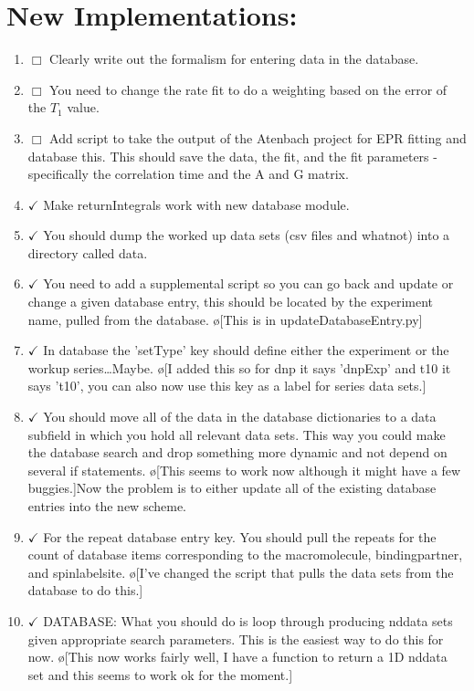\documentclass[10pt]{book}
\begin{document}
\section{New Implementations:}
\begin{enumerate}
    \item $\Box$ Clearly write out the formalism for entering data in the database.
    \item $\Box$ You need to change the rate fit to do a weighting based on the error of the $T_1$ value.
    \item $\Box$ Add script to take the output of the Atenbach project for EPR fitting and database this. This should save the data, the fit, and the fit parameters - specifically the correlation time and the A and G matrix.
    \item $\checkmark$ Make returnIntegrals work with new database module.
    \item $\checkmark$ You should dump the worked up data sets (csv files and whatnot) into a directory called data.
    \item $\checkmark$ You need to add a supplemental script so you can go back and update or change a given database entry, this should be located by the experiment name, pulled from the database. \o[This is in updateDatabaseEntry.py]{}
    \item $\checkmark$ In database the 'setType' key should define either the experiment or the workup series\ldots Maybe. \o[I added this so for dnp it says 'dnpExp' and t10 it says 't10', you can also now use this key as a label for series data sets.]{}
    \item $\checkmark$ You should move all of the data in the database dictionaries to a data subfield in which you hold all relevant data sets. This way you could make the database search and drop something more dynamic and not depend on several if statements. \o[This seems to work now although it might have a few buggies.]{Now the problem is to either update all of the existing database entries into the new scheme.}
    \item $\checkmark$ For the repeat database entry key. You should pull the repeats for the count of database items corresponding to the macromolecule, bindingpartner, and spinlabelsite. \o[I've changed the script that pulls the data sets from the database to do this.]{}
    \item $\checkmark$ DATABASE: What you should do is loop through producing nddata sets given appropriate search parameters. This is the easiest way to do this for now. \o[This now works fairly well, I have a function to return a 1D nddata set and this seems to work ok for the moment.]{}

\end{enumerate}
\end{document}
